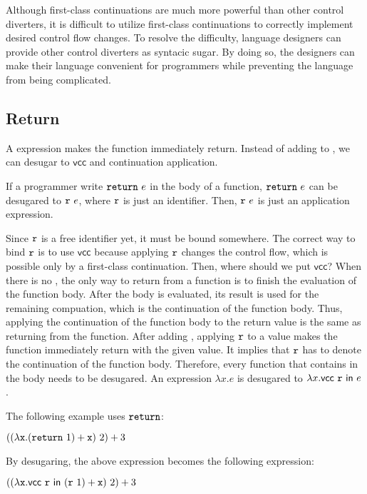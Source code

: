 Although first-class continuations are much more powerful than other control
diverters, it is difficult to utilize first-class continuations to correctly
implement desired control flow changes. To resolve the difficulty, language
designers can provide other control diverters as syntacic sugar. By doing so,
the designers can make their language convenient for programmers while
preventing the language from being complicated.

\subsection{Return}

A  expression makes the function immediately return.
Instead of adding  to \lang, we can desugar  to
$\textsf{vcc}$ and continuation application.

If a programmer write
$\code{return}\ e$ in the body of a function, $\code{return}\ e$
can be desugared to $\texttt{r}\ e$, where $\texttt{r}$ is just an identifier.
Then, $\texttt{r}\ e$ is just an application expression.

Since $\texttt{r}$ is a free
identifier yet, it must be bound somewhere. The correct way to bind $\texttt{r}$
is to use $\textsf{vcc}$ because applying $\texttt{r}$ changes the control flow,
which is possible only by a first-class continuation. Then, where should we put
$\textsf{vcc}$? When there is no
, the only way to return from a function is to finish the
evaluation of the function body. After the body is evaluated, its result is used
for the remaining compuation, which is the continuation of the function body.
Thus, applying the continuation of the function body to the return value is the same as
returning from the function. After adding , applying $\texttt{r}$
to a value makes the function immediately return with the given value.
It implies that $\texttt{r}$ has to denote the continuation of the function body.
Therefore, every function that contains  in the body needs to be
desugared. An expression $\lambda x.e$ is desugared to
$\lambda x.\textsf{vcc}\ \texttt{r}\ \textsf{in}\ e$.

The following example uses $\texttt{return}$:

$((\lambda \cx.(\code{return}\ 1)+\cx)\ 2)+3$

By desugaring, the above expression becomes the following expression:

$((\lambda \cx.\evcc{\code{r}}{(\code{r}\ 1)+\cx})\ 2)+3$

